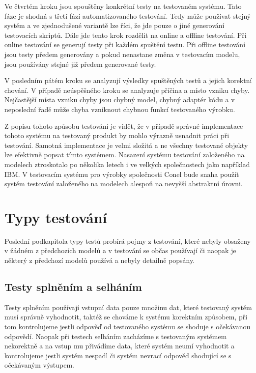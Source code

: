 Ve čtvrtém kroku jsou spouštěny konkrétní testy na testovaném systému. Tato fáze je shodná s třetí fází automatizovaného testování. Tedy může používat stejný systém a ve zjednodušené variantě lze říci, že jde pouze o jiné generování testovacích skriptů. Dále jde tento krok rozdělit na online a offline testování. Při online testování se generují testy při každém spuštění testu. Při offline testování jsou testy předem generovány a pokud nenastane změna v testovacím modelu, jsou používány stejné již předem generované testy.

V posledním pátém kroku se analyzují výsledky spuštěných testů a jejich korektní chování. V případě neúspěšného kroku se analyzuje příčina a místo vzniku chyby. Nejčastější místa vzniku chyby jsou chybný model, chybný adaptér kódu a v neposlední řadě může chyba vzniknout chybnou funkcí testovaného výrobku.

Z popisu tohoto způsobu testování je vidět, že v případě správné implementace tohoto systému na testovaný produkt by mohlo výrazně usnadnit práci při testování. Samotná implementace je velmi složitá a ne všechny testované objekty lze efektivně popsat tímto systémem. Nasazení systému testování založeného na modelech ztroskotalo po několika letech i ve velkých společnostech jako například IBM. V testovacím systému pro výrobky společnosti Conel bude snaha použít systém testování založeného na modelech alespoň  na  nevyšší abstraktní úrovni.

\section{Typy testování}
Poslední podkapitola typy testů probírá pojmy z testování, které nebyly obsaženy v žádném z předchozích modelů a v testování se občas používají či naopak je některý z předchozí modelů používá a nebyly detailně popsány.

\subsection{Testy splněním a selháním}
Testy splněním používají vstupní data pouze množinu dat, které testovaný systém musí správně vyhodnotit, taktéž se chováme k systému korektním způsobem, při tom kontrolujeme jestli odpověď od testovaného systému se shoduje s očekávanou odpovědí. Naopak při testech selháním zacházíme s testovaným systémem nekorektně a na vstup mu přivádíme data, které systém neumí vyhodnotit a kontrolujeme jestli systém nespadl či systém nevrací odpověď shodující se s očekávaným výstupem.

